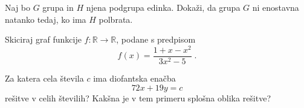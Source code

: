 \documentclass{izpit}
\begin{document}
  \podnaloga[10]
    Naj bo $G$ grupa in $H$ njena podgrupa edinka. Dokaži, da grupa $G$ ni
    enostavna natanko tedaj, ko ima $H$ polbrata.

  \prostor

\naloga[\tocke{25}]
  Skiciraj graf funkcije $f \colon \mathbb{R} \to \mathbb{R}$, podane s
  predpisom
  \[
    f(x) = \frac{1 + x - x^2}{3 x^2 - 5} \;.
  \]



  Za katera cela števila $c$ ima diofantska enačba
  \[
    72 x + 19 y = c
  \]
  rešitve v celih številih? Kakšna je v tem primeru splošna oblika rešitve?
\end{document}
